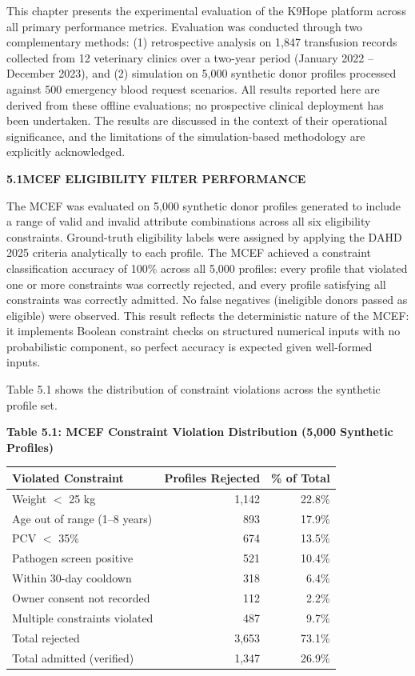 \documentclass[12pt,a4paper]{article}
\begin{document}
\noindent This chapter presents the experimental evaluation of the K9Hope platform across all primary performance metrics. Evaluation was conducted through two complementary methods: (1) retrospective analysis on 1,847 transfusion records collected from 12 veterinary clinics over a two-year period (January 2022 -- December 2023), and (2) simulation on 5,000 synthetic donor profiles processed against 500 emergency blood request scenarios. All results reported here are derived from these offline evaluations; no prospective clinical deployment has been undertaken. The results are discussed in the context of their operational significance, and the limitations of the simulation-based methodology are explicitly acknowledged.

\vspace{2em}
\noindent\textbf{5.1\quad MCEF ELIGIBILITY FILTER PERFORMANCE}
\vspace{0.8em}

\noindent The MCEF was evaluated on 5,000 synthetic donor profiles generated to include a range of valid and invalid attribute combinations across all six eligibility constraints. Ground-truth eligibility labels were assigned by applying the DAHD 2025 criteria analytically to each profile. The MCEF achieved a constraint classification accuracy of 100\% across all 5,000 profiles: every profile that violated one or more constraints was correctly rejected, and every profile satisfying all constraints was correctly admitted. No false negatives (ineligible donors passed as eligible) were observed. This result reflects the deterministic nature of the MCEF: it implements Boolean constraint checks on structured numerical inputs with no probabilistic component, so perfect accuracy is expected given well-formed inputs.

\noindent Table 5.1 shows the distribution of constraint violations across the synthetic profile set.

\begin{center}
\textbf{Table 5.1: MCEF Constraint Violation Distribution (5,000 Synthetic Profiles)}
\vspace{0.4em}
\begin{tabular}{lrr}
\toprule
\textbf{Violated Constraint} & \textbf{Profiles Rejected} & \textbf{\% of Total} \\
\midrule
Weight $<$ 25 kg & 1,142 & 22.8\% \\
Age out of range (1--8 years) & 893 & 17.9\% \\
PCV $<$ 35\% & 674 & 13.5\% \\
Pathogen screen positive & 521 & 10.4\% \\
Within 30-day cooldown & 318 & 6.4\% \\
Owner consent not recorded & 112 & 2.2\% \\
Multiple constraints violated & 487 & 9.7\% \\
\midrule
Total rejected & 3,653 & 73.1\% \\
Total admitted (verified) & 1,347 & 26.9\% \\
\bottomrule
\end{tabular}
\end{center}
\end{document}
